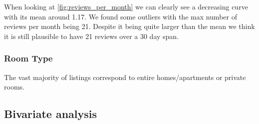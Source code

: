 
When looking at \ref{fig:reviews_per_month} we can clearly see a decreasing curve with its mean around 1.17. We found some outliers with the max number of reviews per month being 21. Despite it being quite larger than the mean we think it is still plausible to have 21 reviews over a 30 day span.


\pagebreak
\subsubsection{Room Type}


The vast majority of listings correspond to entire homes/apartments or private rooms.

\pagebreak
\subsection{Bivariate analysis}%


\label{sub:bivariate_analysis}


